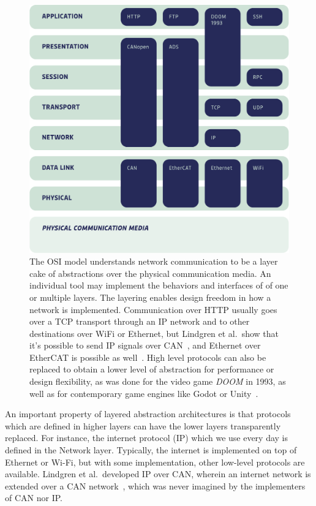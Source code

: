 \documentclass[english,12pt,a4paper,pdftex,eng,utf8]{aaltothesis}
\begin{document}
\begin{figure}[h]
  \centering
  \includegraphics[width=\textwidth]{assets/osi_model}
  \caption{The OSI model understands network communication to be a layer cake of abstractions over the physical communication media.  An individual tool may implement the behaviors and interfaces of of one or multiple layers.  The layering enables design freedom in how a network is implemented.  Communication over HTTP usually goes over a TCP transport through an IP network and to other destinations over WiFi or Ethernet, but Lindgren et al.\ show that it's possible to send IP signals over CAN~\cite{Lindgren2008}, and Ethernet over EtherCAT is possible as well~\cite[§1.9.3]{EtherCATFieldbus}.  High level protocols can also be replaced to obtain a lower level of abstraction for performance or design flexibility, as was done for the video game \emph{DOOM} in 1993, as well as for contemporary game engines like Godot or Unity~\cite{DOOM1993,GodotMultiplayer,UnityTransport}.}\label{fig:osi_model}
\end{figure}

An important property of layered abstraction architectures is that protocols which are defined in higher layers can have the lower layers transparently replaced. For instance, the internet protocol (IP) which we use every day is defined in the Network layer. Typically, the internet is implemented on top of Ethernet or Wi-Fi, but with some implementation, other low-level protocols are available. Lindgren et al.\ developed IP over CAN, wherein an internet network is extended over a CAN network~\cite{Lindgren2008}, which was never imagined by the implementers of CAN nor IP.
\end{document}
